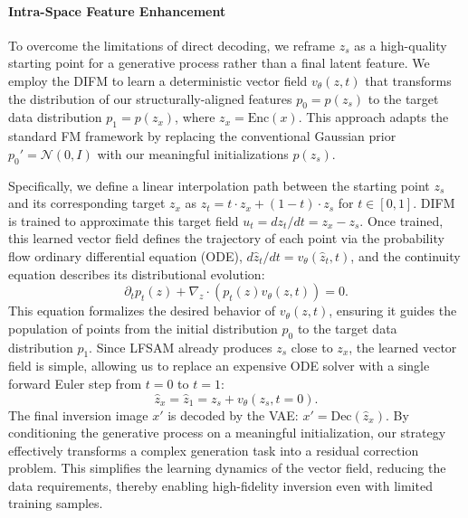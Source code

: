 \paragraph{Intra-Space Feature Enhancement}
To overcome the limitations of direct decoding, we reframe $z_s$ as a high-quality starting point for a generative process rather than a final latent feature. 
We employ the DIFM to learn a deterministic vector field $v_\theta(z,t)$ that transforms the distribution of our structurally-aligned features $p_0 = p(z_s)$ to the target data distribution $p_1 = p(z_x)$, where $z_x=\text{Enc}(x)$.
This approach adapts the standard FM framework by replacing the conventional Gaussian prior $p_0' = \mathcal{N}(0, I)$ with our meaningful initializations $p(z_s)$.


Specifically, we define a linear interpolation path between the starting point $z_s$ and its corresponding target $z_x$ as $z_t = t \cdot z_x +(1-t) \cdot z_s $ for $t\in [0,1]$. 
DIFM is trained to approximate this target field $u_t={dz_t}/{dt}=z_x-z_s$. 
Once trained, this learned vector field defines the trajectory of each point via the probability flow ordinary differential equation (ODE), $d\hat{z}_t/{dt}=v_{\theta}(\hat{z}_t,t)$, and the continuity equation describes its distributional evolution:
\begin{equation}
\partial_t p_t(z) + \nabla_z \cdot (p_t(z) v_\theta(z, t)) = 0.
\end{equation}
This equation formalizes the desired behavior of $v_\theta(z,t)$, ensuring it guides the population of points from the initial distribution $p_0$ to the target data distribution $p_1$.
Since LFSAM already produces $z_s$ close to $z_x$, the learned vector field is simple, allowing us to replace an expensive ODE solver with a single forward Euler step from $t=0$ to $t=1$:
\begin{equation}
\hat{z}_x =\hat{z}_1= z_s +v_\theta(z_s, t=0).
\end{equation}
The final inversion image $x'$ is decoded by the VAE: $x'=\text{Dec}(\hat{z}_x)$. 
By conditioning the generative process on a meaningful initialization, our strategy effectively transforms a complex generation task into a residual correction problem. 
This simplifies the learning dynamics of the vector field, reducing the data requirements, thereby enabling high-fidelity inversion even with limited training samples.



